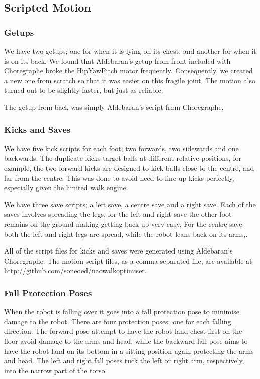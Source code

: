 \subsection{Scripted Motion}
\subsubsection{Getups}
We have two getups; one for when it is lying on its chest, and another for when it is on its back. We found that Aldebaran's getup from front included with Choregraphe broke the HipYawPitch motor frequently. Consequently, we created a new one from scratch so that it was easier on this fragile joint. The motion also turned out to be slightly faster, but just as reliable. 

The getup from back was simply Aldebaran's script from Choregraphe.

\subsubsection{Kicks and Saves}
We have five kick scripts for each foot; two forwards, two sidewards and one backwards. The duplicate kicks target balls at different relative positions, for example, the two forward kicks are designed to kick balls close to the centre, and far from the centre. This was done to avoid need to line up kicks perfectly, especially given the limited walk engine.

We have three save scripts; a left save, a centre save and a right save. Each of the saves involves spreading the legs, for the left and right save the other foot remains on the ground making getting back up very easy. For the centre save both the left and right legs are spread, while the robot leans back on its arms,.

All of the script files for kicks and saves were generated using Aldebaran's Choregraphe. The motion script files, as a comma-separated file, are available at \href{http://github.com/soneoed/naowalkoptimiser}{http://github.com/soneoed/naowalkoptimiser}.

\subsubsection{Fall Protection Poses}
When the robot is falling over it goes into a fall protection pose to minimise damage to the robot. There are four protection poses; one for each falling direction. The forward pose attempt to have the robot land chest-first on the floor avoid damage to the arms and head, while the backward fall pose aims to have the robot land on its bottom in a sitting position again protecting the arms and head. The left and right fall poses tuck the left or right arm, respectively, into the narrow part of the torso. 

